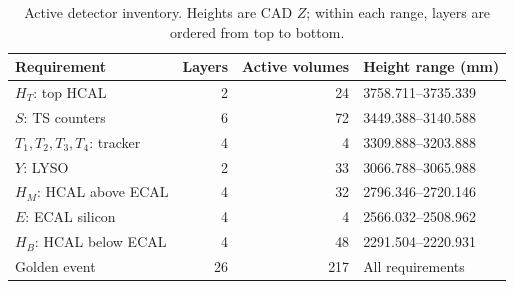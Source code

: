 \begin{table}[htbp]
\centering\small
\caption{Active detector inventory. Heights are CAD $Z$; within each range, layers are ordered from top to bottom.}\label{tab:inventory}
\begin{tabular}{lrrl}
\toprule
Requirement & Layers & Active volumes & Height range (mm)\\
\midrule
$H_T$: top HCAL & 2 & 24 & 3758.711--3735.339\\
$S$: TS counters & 6 & 72 & 3449.388--3140.588\\
$T_1,T_2,T_3,T_4$: tracker & 4 & 4 & 3309.888--3203.888\\
$Y$: LYSO & 2 & 33 & 3066.788--3065.988\\
$H_M$: HCAL above ECAL & 4 & 32 & 2796.346--2720.146\\
$E$: ECAL silicon & 4 & 4 & 2566.032--2508.962\\
$H_B$: HCAL below ECAL & 4 & 48 & 2291.504--2220.931\\
\midrule
Golden event & 26 & 217 & All requirements\\
\bottomrule
\end{tabular}
\end{table}
